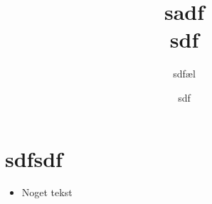 \documentclass[a4paper, 12pt]{article}
\author{sdfæl}
\date{sdf}
\title{sadf\\\medskip
\large sdf}
\begin{document}
\maketitle
\section*{sdfsdf}
\label{sec:orgc444503}

\begin{itemize}
\item[{$\boxtimes$}] Noget tekst
\end{itemize}
\end{document}
